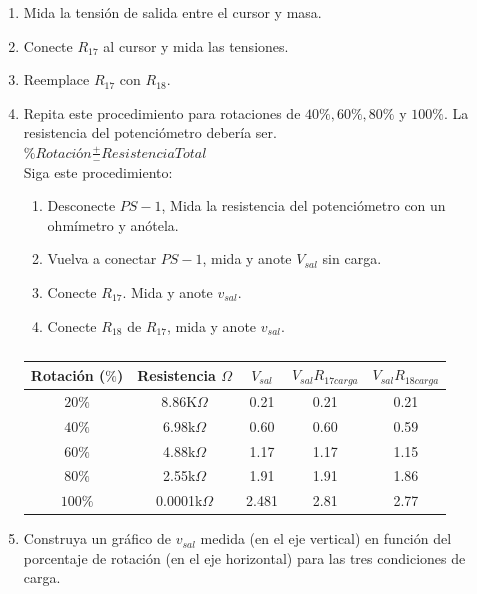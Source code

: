 \begin{enumerate}
\begin{table}[h]
\begin{tabular}{|c|c|c|c|c|}
			\hline
		\end{tabular}
		\caption{}
	\end{table}
	\item Mida la tensión de salida entre el cursor y masa.
	\item Conecte $R_{17}$ al cursor y  mida las tensiones.
	\item Reemplace $R_{17}$ con $R_{18}$.
	\item Repita este procedimiento para rotaciones de $40\%, 60\%, 80\%$ y $100\%$. La resistencia del potenciómetro debería ser.
	\\
	\textbf{$\% Rotación \frac{+}{-} Resistencia Total$}
	\\
	Siga este procedimiento:
	\begin{enumerate}
		\item Desconecte $PS-1$, Mida la resistencia del potenciómetro con un ohmímetro y anótela.
		\item Vuelva a conectar $PS-1$, mida y anote $V_{sal}$ sin carga.
		\item Conecte $R_{17}$. Mida y anote $v_{sal}$.
		\item Conecte $R_{18}$ de $R_{17}$, mida y anote $v_{sal}$.
	\end{enumerate}
	\begin{table}[h]
		\centering
		\begin{tabular}{|c|c|c|c|c|}
			\hline
			\textbf{Rotación ($\%$)}&\textbf{Resistencia $\Omega$}&\textbf{$V_{sal}$}&\textbf{$V_{sal} R_{17 carga}$}&\textbf{$V_{sal} R_{18 carga}$}\\
			\hline 
			$20\%$&8.86K$\Omega$&0.21&0.21&0.21\\ 
			\hline 
			$40\%$&6.98k$\Omega$&0.60&0.60&0.59\\ 
			\hline
			$60\%$&4.88k$\Omega$&1.17&1.17&1.15\\ 
			\hline
			$80\%$&2.55k$\Omega$&1.91&1.91&1.86\\ 
			\hline
			$100\%$&0.0001k$\Omega$&2.481&2.81&2.77\\ 
			\hline
		\end{tabular}
		\caption{}
	\end{table}
	\item Construya un gráfico de $v_{sal}$ medida (en el eje vertical) en función del porcentaje de rotación (en el eje horizontal) para las tres condiciones de carga.
	\\
	\\
	\\
	\\

\end{enumerate}
